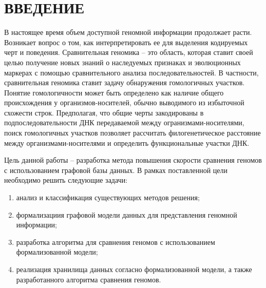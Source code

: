 \section*{ВВЕДЕНИЕ}
	В настоящее время объем доступной геномной информации продолжает расти. Возникает вопрос о том, как интерпретировать ее для выделения кодируемых черт и поведения. Сравнительная геномика -- это область, которая ставит своей целью получение новых знаний о наследуемых признаках и эволюционных маркерах с помощью сравнительного анализа последовательностей\cite{1_hardison2003comparative}. В частности, сравнительная геномика ставит задачу обнаружения гомологичных участков. Понятие гомологичности может быть определено как наличие общего происхождения\cite{1_hardison2003comparative} у организмов-носителей, обычно выводимого из избыточной схожести строк\cite{2_pearson2013introduction}. Предполагая, что общие черты закодированы в подпоследовательности ДНК передаваемой между огранизмами-носителями, поиск гомологичных участков позволяет рассчитать филогенетическое расстояние\cite{1_hardison2003comparative,2_pearson2013introduction} между организмами-носителями и определить функциональные участки ДНК\cite{1_hardison2003comparative,2_pearson2013introduction}.
	
	Цель данной работы -- разработка метода повышения скорости сравнения геномов с использованием графовой базы данных. В рамках поставленной цели необходимо решить следующие задачи:
	\begin{enumerate}
		\item анализ и классификация существующих методов решения;
		\item формализациия графовой модели данных для представления геномной информации;
		\item разработка алгоритма для сравнения геномов с использованием формализованной модели;
		\item реализация хранилища данных согласно формализованной модели, а также разработанного алгоритма сравнения геномов.
	\end{enumerate}
\pagebreak